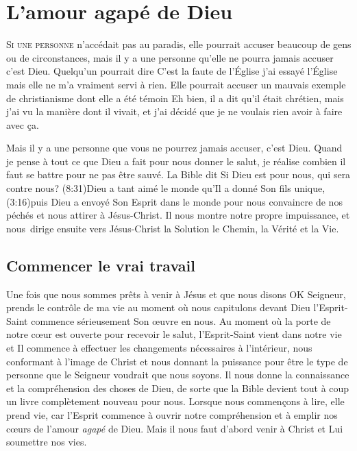 \chapter{L'amour agap\'e de Dieu}

\lettrine{S}{i une personne} n'accédait pas au paradis,
 elle pourrait accuser beaucoup de gens
 ou de circonstances, mais il y a une personne
 qu'elle ne pourra jamais accuser\frcolon{} c'est Dieu.
 Quelqu'un pourrait dire\frcolon{}
 \Og C'est la faute de l'Église\frcolon{} j'ai essayé l'Église mais
 elle ne m'a vraiment servi à rien. \Fg{}
 Elle pourrait accuser un mauvais exemple de christianisme
 dont elle a été témoin\frcolon{}
 \Og Eh bien, il a dit qu'il était chrétien, mais j'ai vu la manière
 dont il vivait, et j'ai décidé que je ne voulais rien avoir à faire
 avec ça. \Fg{}

Mais il y a une personne que vous ne pourrez jamais accuser, c'est Dieu.
 Quand je pense à tout ce que Dieu a fait pour nous donner le salut,
 je réalise combien il faut se battre pour ne pas être sauvé.
 La Bible dit\frcolon{}
 \Og Si Dieu est pour nous, qui sera contre nous? \Fg{}
 (8:31)Dieu a tant aimé le monde qu'Il a donné
 Son fils unique, (3:16)puis Dieu a envoyé Son Esprit
 dans le monde pour nous convaincre
 de nos péchés et nous attirer à Jésus-Christ.
 Il nous montre notre propre impuissance, et nous~dirige ensuite
 vers Jésus-Christ la Solution \ocadr le Chemin, la Vérité et la Vie.

\section{Commencer le vrai travail}

Une fois que nous sommes prêts à venir à Jésus
 et que nous disons\frcolon{}
 \Og OK Seigneur, prends le contrôle de ma vie \Fg{}
 \ocadr au moment où nous capitulons devant Dieu \fcadr
 l'Esprit-Saint commence sérieusement Son œuvre en nous.
 Au moment où la porte de notre cœur est ouverte pour recevoir le salut,
 l'Esprit-Saint vient dans notre vie et Il commence à effectuer
 les changements nécessaires à l'intérieur, nous conformant
 à l'image de Christ et nous donnant la puissance pour être
 le type de personne que le Seigneur voudrait que nous soyons.
 Il nous donne la connaissance et la compréhension des choses de Dieu,
 de sorte que la Bible devient tout à coup un livre complètement
 nouveau pour nous. Lorsque nous commençons à lire,
 elle prend vie, car l'Esprit commence à ouvrir notre compréhension
 et à emplir nos cœurs de l'amour \emph{agapé} de Dieu.
 Mais il nous faut d'abord venir à Christ
 et Lui soumettre nos vies.

